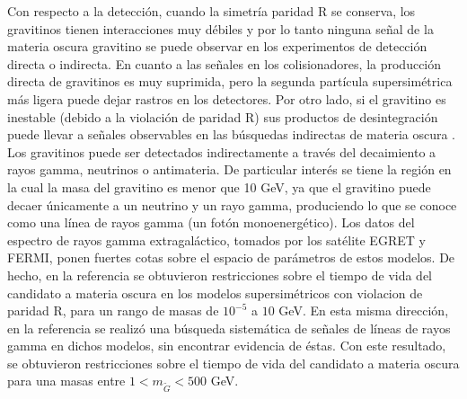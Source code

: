 Con respecto a la detección, cuando la simetría paridad R se conserva, los gravitinos tienen interacciones muy débiles y por lo tanto ninguna señal de la materia oscura gravitino se puede observar en los experimentos de detección directa o indirecta. En cuanto a las señales en los colisionadores, la producción directa de gravitinos es muy suprimida, pero la segunda partícula supersimétrica más  ligera puede dejar rastros en los detectores. Por otro lado, si el gravitino es inestable (debido a la violación de paridad R) sus productos de desintegración puede llevar a  señales observables en las búsquedas indirectas de materia oscura \cite{Bertone:2007aw,Ibarra:2007wg,Covi:2008jy,Ibarra:2008qg}. Los gravitinos puede ser detectados indirectamente a través del decaimiento a rayos gamma, neutrinos o antimateria. De particular interés se tiene la región en la cual la masa del gravitino es menor que 10 GeV, ya que el gravitino puede decaer únicamente a un neutrino y un rayo gamma, produciendo lo que se conoce como una línea de rayos gamma (un fotón monoenergético). Los datos del espectro de rayos gamma extragaláctico, tomados por los satélite EGRET y FERMI, ponen fuertes cotas sobre el espacio de parámetros de estos modelos. De hecho, en la referencia \cite{Yuksel:2007dr} se obtuvieron restricciones sobre el tiempo de vida del candidato a materia oscura en los modelos supersimétricos con violacion de paridad R, para un rango de masas de $10^{-5}$ a $10$ GeV. En esta misma direcci\'on, en la referencia \cite{Vertongen:2011mu} se realizó una búsqueda sistemática de señales de líneas de rayos gamma en dichos modelos, sin encontrar evidencia de éstas. Con este resultado, se obtuvieron restricciones sobre el tiempo de vida del candidato a materia oscura para una masas entre $1<m_{\tilde G}< 500$ GeV. 


